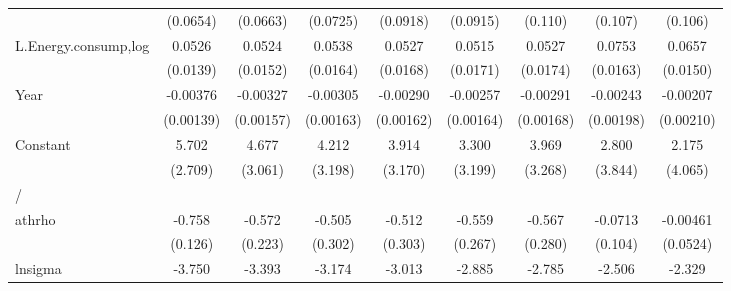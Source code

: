 \begin{table}[htbp]
\begin{tabular}{l*{8}{c}}
                    &    (0.0654)         &    (0.0663)         &    (0.0725)         &    (0.0918)         &    (0.0915)         &     (0.110)         &     (0.107)         &     (0.106)         \\
[1em]
L.Energy.consump,log&      0.0526\sym{***}&      0.0524\sym{***}&      0.0538\sym{***}&      0.0527\sym{***}&      0.0515\sym{***}&      0.0527\sym{***}&      0.0753\sym{***}&      0.0657\sym{***}\\
                    &    (0.0139)         &    (0.0152)         &    (0.0164)         &    (0.0168)         &    (0.0171)         &    (0.0174)         &    (0.0163)         &    (0.0150)         \\
[1em]
Year                &    -0.00376\sym{***}&    -0.00327\sym{**} &    -0.00305\sym{*}  &    -0.00290\sym{*}  &    -0.00257         &    -0.00291\sym{*}  &    -0.00243         &    -0.00207         \\
                    &   (0.00139)         &   (0.00157)         &   (0.00163)         &   (0.00162)         &   (0.00164)         &   (0.00168)         &   (0.00198)         &   (0.00210)         \\
[1em]
Constant            &       5.702\sym{**} &       4.677         &       4.212         &       3.914         &       3.300         &       3.969         &       2.800         &       2.175         \\
                    &     (2.709)         &     (3.061)         &     (3.198)         &     (3.170)         &     (3.199)         &     (3.268)         &     (3.844)         &     (4.065)         \\
\hline
/                   &                     &                     &                     &                     &                     &                     &                     &                     \\
athrho              &      -0.758\sym{***}&      -0.572\sym{**} &      -0.505\sym{*}  &      -0.512\sym{*}  &      -0.559\sym{**} &      -0.567\sym{**} &     -0.0713         &    -0.00461         \\
                    &     (0.126)         &     (0.223)         &     (0.302)         &     (0.303)         &     (0.267)         &     (0.280)         &     (0.104)         &    (0.0524)         \\
[1em]
lnsigma             &      -3.750\sym{***}&      -3.393\sym{***}&      -3.174\sym{***}&      -3.013\sym{***}&      -2.885\sym{***}&      -2.785\sym{***}&      -2.506\sym{***}&      -2.329\sym{***}\\

\end{tabular}
\end{table}
